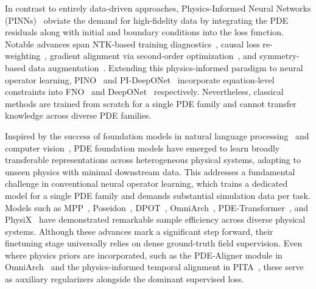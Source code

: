 \documentclass{article}
\begin{document}
In contrast to entirely data-driven approaches, Physics-Informed Neural Networks (PINNs)~\cite{raissi2019pinn} obviate the demand for high-fidelity data by integrating the PDE residuals along with initial and boundary conditions into the loss function. Notable advances span NTK-based training diagnostics~\cite{wang2020ntkpinn}, causal loss re-weighting~\cite{wang2022causalpinn}, gradient alignment via second-order optimization~\cite{wang2025gradientalignment}, and symmetry-based data augmentation~\cite{brandstetter2022lpsda}. Extending this physics-informed paradigm to neural operator learning, PINO~\cite{li2024pino} and PI-DeepONet~\cite{wang2021pideeponet} incorporate equation-level constraints into FNO~\cite{li2021fourier} and DeepONet~\cite{lu2021deeponet} respectively. Nevertheless, classical methods are trained from scratch for a single PDE family and cannot transfer knowledge across diverse PDE families.



Inspired by the success of foundation models in natural language processing~\cite{brown2020language, devlin2019bert} and computer vision~\cite{dosovitskiy2021vit}, PDE foundation models have emerged to learn broadly transferable representations across heterogeneous physical systems, adapting to unseen physics with minimal downstream data. This addresses a fundamental challenge in conventional neural operator learning, which trains a dedicated model for a single PDE family and demands substantial simulation data per task. Models such as MPP~\cite{mccabe2024mpp}, Poseidon~\cite{herde2024poseidon}, DPOT~\cite{hao2024dpot}, OmniArch~\cite{chen2025omniarch}, PDE-Transformer~\cite{holzschuh2025pdetransformer}, and PhysiX~\cite{nguyen2025physix} have demonstrated remarkable sample efficiency across diverse physical systems. Although these advances mark a significant step forward, their finetuning stage universally relies on dense ground-truth field supervision. Even where physics priors are incorporated, such as the PDE-Aligner module in OmniArch~\cite{chen2025omniarch} and the physics-informed temporal alignment in PITA~\cite{zhu2025pita}, these serve as auxiliary regularizers alongside the dominant supervised loss.
\end{document}
